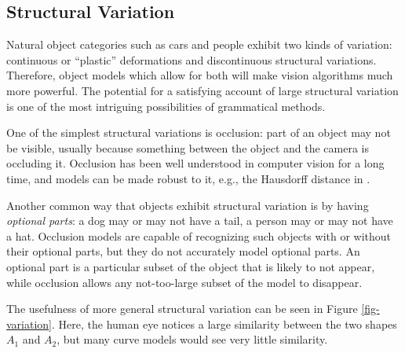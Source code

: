 
\subsection{Structural Variation}
\label{sec-structural}



Natural object categories such as cars and people exhibit two kinds of
variation: continuous or ``plastic'' deformations and discontinuous
structural variations. Therefore, object models which allow for both
will make vision algorithms much more powerful.  The potential for a
satisfying account of large structural variation is one of the most
intriguing possibilities of grammatical methods.

One of the simplest structural variations is occlusion: part of an
object may not be visible, usually because something between the
object and the camera is occluding it. Occlusion has been well
understood in computer vision for a long time, and models can be made
robust to it, e.g., the Hausdorff distance in \cite{hausdorff}. 

Another common way that objects exhibit structural variation is by
having \emph{optional parts}: a dog may or may not have a tail, a
person may or may not have a hat. Occlusion models are capable of
recognizing such objects with or without their optional parts, but
they do not accurately model optional parts. An optional part is a
particular subset of the object that is likely to not appear, while
occlusion allows any not-too-large subset of the model to disappear.

The usefulness of more general structural variation can be seen in
Figure \ref{fig-variation}. Here, the human eye notices a large
similarity between the two shapes $A_1$ and $A_2$, but many curve
models would see very little similarity.

